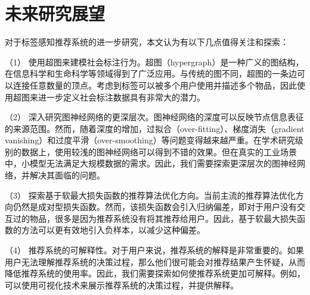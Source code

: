 \section{未来研究展望}
对于标签感知推荐系统的进一步研究，本文认为有以下几点值得关注和探索：

（1） 使用超图来建模社会标注行为。超图（hypergraph）是一种广义的图结构，在信息科学和生命科学等领域得到了广泛应用。与传统的图不同，超图的一条边可以连接任意数量的顶点。考虑到标签可以被多个用户使用并描述多个物品，因此使用超图来进一步定义社会标注数据具有非常大的潜力。

（2） 深入研究图神经网络的更深层次。图神经网络的深度可以反映节点信息表征的来源范围。然而，随着深度的增加，过拟合（over-fitting）、梯度消失（gradient vanishing）和过度平滑（over-smoothing）等问题变得越来越严重。在学术研究级别的数据上，使用较浅的图神经网络可以得到不错的效果。但在真实的工业场景中，小模型无法满足大规模数据的需求。因此，我们需要探索更深层次的图神经网络，并解决其面临的问题。

（3） 探索基于软最大损失函数的推荐算法优化方向。当前主流的推荐算法优化方向仍然是成对型损失函数。然而，该损失函数会引入归纳偏差，即对于用户没有交互过的物品，很多是因为推荐系统没有将其推荐给用户。因此，基于软最大损失函数的方法可以更有效地引入负样本，以减少这种偏差。

（4） 推荐系统的可解释性。对于用户来说，推荐系统的解释是非常重要的。如果用户无法理解推荐系统的决策过程，那么他们很可能会对推荐结果产生怀疑，从而降低推荐系统的使用率。因此，我们需要探索如何使推荐系统更加可解释。例如，可以使用可视化技术来展示推荐系统的决策过程，并提供解释。
